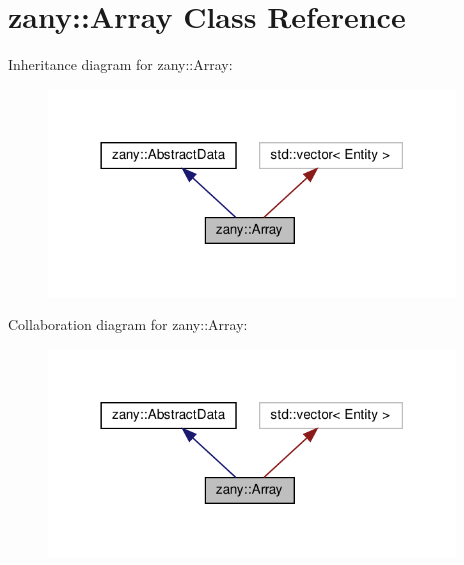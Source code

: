 \hypertarget{classzany_1_1_array}{}\section{zany\+:\+:Array Class Reference}
\label{classzany_1_1_array}


Inheritance diagram for zany\+:\+:Array\+:
\nopagebreak
\begin{figure}[H]
\begin{center}
\leavevmode
\includegraphics[width=306pt]{classzany_1_1_array__inherit__graph}
\end{center}
\end{figure}


Collaboration diagram for zany\+:\+:Array\+:
\nopagebreak
\begin{figure}[H]
\begin{center}
\leavevmode
\includegraphics[width=306pt]{classzany_1_1_array__coll__graph}
\end{center}
\end{figure}
